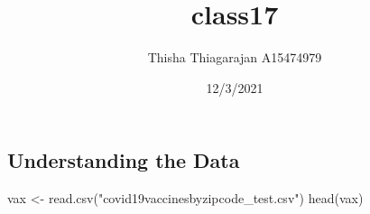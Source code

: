 \documentclass[
]{article}
\title{class17}
\author{Thisha Thiagarajan A15474979}
\date{12/3/2021}
\newenvironment{Shaded}{\begin{snugshade}}{\end{snugshade}}
\newcommand{\FunctionTok}[1]{\textcolor[rgb]{0.00,0.00,0.00}{#1}}
\newcommand{\NormalTok}[1]{#1}
\newcommand{\OtherTok}[1]{\textcolor[rgb]{0.56,0.35,0.01}{#1}}
\newcommand{\StringTok}[1]{\textcolor[rgb]{0.31,0.60,0.02}{#1}}
\begin{document}
\maketitle

\hypertarget{understanding-the-data}{%
\subsection{Understanding the Data}\label{understanding-the-data}}

\begin{Shaded}
\begin{Highlighting}[]
\NormalTok{vax }\OtherTok{\textless{}{-}} \FunctionTok{read.csv}\NormalTok{(}\StringTok{"covid19vaccinesbyzipcode\_test.csv"}\NormalTok{)}
\FunctionTok{head}\NormalTok{(vax)}
\end{Highlighting}
\end{Shaded}
\end{document}
